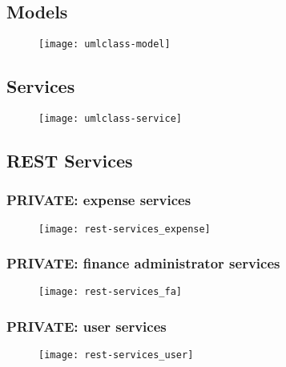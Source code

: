 \chapter{}

\section{Models}
\label{sec:app-models}

\begin{figure}[H]
    {\texttt{[image: umlclass-model]}}
\end{figure}

\section{Services}
\label{sec:app-service}

\begin{figure}[H]
    {\texttt{[image: umlclass-service]}}
\end{figure}

\section{REST Services}
\label{sec:rest-services}

\subsection{PRIVATE: expense services}
\begin{figure}[H]
    {\texttt{[image: rest-services\_expense]}}
\end{figure}
\newpage

\subsection{PRIVATE: finance administrator services}
\begin{figure}[H]
    {\texttt{[image: rest-services\_fa]}}
\end{figure}

\subsection{PRIVATE: user services}
\begin{figure}[H]
    {\texttt{[image: rest-services\_user]}}
\end{figure}

